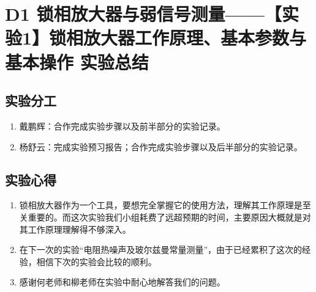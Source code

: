 \documentclass[dvipsnames, svgnames,a4paper,11pt]{article}
\begin{document}
\clearpage
\section{D1 \quad 锁相放大器与弱信号测量——【实验1】锁相放大器工作原理、基本参数与基本操作 \quad\heiti 实验总结}

\subsection{实验分工}
	\begin{enumerate}
		\item 戴鹏辉：合作完成实验步骤以及前半部分的实验记录。
		\item 杨舒云：完成实验预习报告；合作完成实验步骤以及后半部分的实验记录。
	\end{enumerate}


\subsection{实验心得}
	\begin{enumerate}
		\item 锁相放大器作为一个工具，要想完全掌握它的使用方法，理解其工作原理是至关重要的。而这次实验我们小组耗费了远超预期的时间，主要原因大概就是对其工作原理理解得不够深入。
		
		\item 在下一次的实验“电阻热噪声及玻尔兹曼常量测量”，由于已经累积了这次的经验，相信下次的实验会比较的顺利。
		
		\item 感谢何老师和柳老师在实验中耐心地解答我们的问题。

	\end{enumerate}
\end{document}
